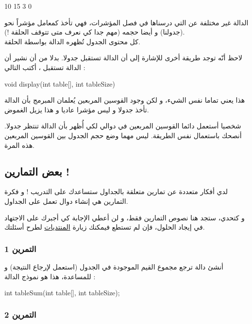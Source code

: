 \begin{Console}
10
15
3
0
\end{Console}

الدالة غير مختلفة عن التي درسناها في فصل المؤشرات، فهي تأخذ كمعامل مؤشراً نحو
(جدولنا) و أيضا حجمه (مهم جدا كي نعرف متى تتوقف الحلقة !).\\
كل محتوى الجدول تُظهره الدالة بواسطة الحلقة.

لاحظ أنّه توجد طريقة أخرى للإشارة إلى أن الدالة تستقبل جدولا. بدلا من أن نشير أن الدالة تستقبل
،
أكتب التالي :

\begin{Csource}
void display(int table[], int tableSize)
\end{Csource}

هذا يعني تماما نفس الشيء، و لكن وجود القوسين المربعين يُعلمان المبرمج بأن الدالة تأخذ جدولا و ليس مؤشرا عاديا و هذا يزيل الغموض.

شخصيا أستعمل دائما القوسين المربعين في دوالي لكي أُظهر بأن الدالة تنتظر جدولا. أنصحك باستعمال نفس الطريقة. ليس مهما وضع حجم الجدول بين القوسين المربعين هذه المرة.

\subsection{بعض التمارين !}

لدي أفكار متعددة عن تمارين متعلقة بالجداول ستساعدك على التدريب ! و فكرة التمارين هي إنشاء دوال تعمل على الجداول.

و كتحدي، ستجد هنا نصوص  التمارين فقط، و لن أعطي الإجابة كي أجبرك على الاجتهاد في إيجاد الحلول، فإن لم تستطع فيمكنك زيارة 
\href{http://www.siteduzero.com/forum-81-126-langage-c.html}{المنتديات} 
لطرح أسئلتك.

\subsubsection{التمرين 1}

أنشئ دالة
ترجع مجموع القيم الموجودة في الجدول (استعمل
لإرجاع النتيجة) و  للمساعدة، هذا هو نموذج  الدالة :

\begin{Csource}
int tableSum(int table[], int tableSize);
\end{Csource}

\subsubsection{التمرين 2}

